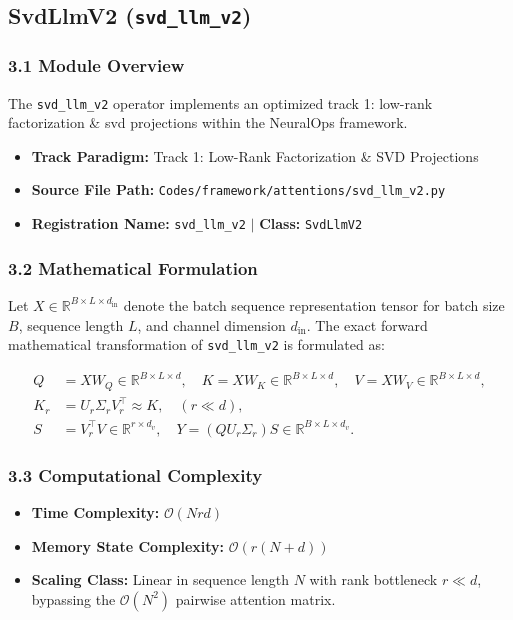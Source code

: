 \subsection{SvdLlmV2 (\texttt{svd\_llm\_v2})}
\label{sec:app_module_svd_llm_v2}

\subsubsection*{3.1 Module Overview}
The \texttt{svd\_llm\_v2} operator implements an optimized track 1: low-rank factorization \& svd projections within the NeuralOps framework.
\begin{itemize}
    \item \textbf{Track Paradigm:} Track 1: Low-Rank Factorization \& SVD Projections
    \item \textbf{Source File Path:} \texttt{Codes/framework/attentions/svd\_llm\_v2.py}
    \item \textbf{Registration Name:} \texttt{svd\_llm\_v2} $\mid$ \textbf{Class:} \texttt{SvdLlmV2}
\end{itemize}

\subsubsection*{3.2 Mathematical Formulation}
Let $X \in \mathbb{R}^{B \times L \times d_{\text{in}}}$ denote the batch sequence representation tensor for batch size $B$, sequence length $L$, and channel dimension $d_{\text{in}}$. The exact forward mathematical transformation of \texttt{svd\_llm\_v2} is formulated as:

\begin{align}
Q &= X W_Q \in \mathbb{R}^{B \times L \times d}, \quad K = X W_K \in \mathbb{R}^{B \times L \times d}, \quad V = X W_V \in \mathbb{R}^{B \times L \times d}, \\
K_r &= U_r \Sigma_r V_r^\top \approx K, \quad (r \ll d), \\
S &= V_r^\top V \in \mathbb{R}^{r \times d_v}, \quad Y = (Q U_r \Sigma_r) S \in \mathbb{R}^{B \times L \times d_v}.
\end{align}


\subsubsection*{3.3 Computational Complexity}
\begin{itemize}
    \item \textbf{Time Complexity:} $\mathcal{O}(N r d)$
    \item \textbf{Memory State Complexity:} $\mathcal{O}(r(N + d))$
    \item \textbf{Scaling Class:} Linear in sequence length $N$ with rank bottleneck $r \ll d$, bypassing the $\mathcal{O}(N^2)$ pairwise attention matrix.
\end{itemize}

